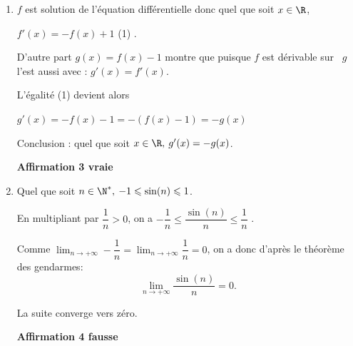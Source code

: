 \begin{enumerate}
		\hfill\textbf{Affirmation 2 vraie}

		\item $f$ est solution de l'équation différentielle donc quel que soit $x \in \R$,

		$f'(x) = - f(x) + 1$ \quad (1) .

		D'autre part $g(x) = f(x) - 1$ montre que puisque $f$ est dérivable sur \, $g$ l'est aussi avec : $g'(x) = f'(x)$.

		L'égalité (1) devient alors

		$g'(x) 	= - f(x) - 1 = - (f(x) - 1) = - g(x)$

		Conclusion : quel que soit $x \in \R, \: g'(x)= - g(x)$.

		\hfill\textbf{Affirmation 3 vraie}

		\item Quel que soit $n \in \N^*, \: - 1 \leqslant \sin (n) \leqslant 1$.

		En multipliant par $\dfrac1n > 0$, on a
		$- \dfrac{1}{n} \leqslant \dfrac{\sin(n)}{n} \leqslant \dfrac{1}{n}$ .

		Comme $\displaystyle\lim_{n \to + \infty} -\dfrac{1}{n} = \displaystyle\lim_{n \to + \infty} \dfrac{1}{n} = 0$, on a donc d'après le théorème des gendarmes:
		\[\displaystyle\lim_{n \to + \infty}\dfrac{\sin(n)}{n} = 0.\]

		La suite converge vers zéro.

		\hfill\textbf{Affirmation 4 fausse}


\end{enumerate}
